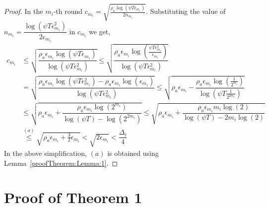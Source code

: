 \begin{proof}
In the $m_i$-th round $c_{m_i} =\sqrt{\frac{\rho_{a}\log (\psi T\epsilon_{m_{i}})}{2 n_{m_i}}}$. Substituting the value of $n_{m_i}=\dfrac{\log{(\psi T\epsilon_{m_{i}}^{2})}}{2\epsilon_{m_{i}}}$ in $c_{m_i}$ we get,
\begin{align*}
	c_{m_i} &\leq \sqrt{\dfrac{\rho_a \epsilon_{m_{i}}\log (\psi T\epsilon_{m_{i}})}{\log(\psi T\epsilon_{m_{i}}^{2})}} \leq \sqrt{\dfrac{\rho_a \epsilon_{m_{i}}\log (\frac{\psi T\epsilon_{m_{i}}^{2}}{\epsilon_{m_{i}}})}{\log(\psi T\epsilon_{m_{i}}^{2})}} \\
	& = \sqrt{\dfrac{\rho_a\epsilon_{m_{i}}\log (\psi T\epsilon_{m_{i}}^{2}) - \rho_a\epsilon_{m_{i}}\log (\epsilon_{m_{i}})}{\log(\psi T\epsilon_{m_{i}}^{2})}} 
	\leq  \sqrt{\rho_a\epsilon_{m_{i}} - \dfrac{\rho_a\epsilon_{m_i}\log(\frac{1}{2^{m_i}})}{\log(\psi T \frac{1}{2^{2m_i}})}} \\
	&\leq \sqrt{\rho_a\epsilon_{m_{i}} + \dfrac{\rho_a\epsilon_{m_i}\log(2^{m_i})}{\log(\psi T) - \log( 2^{2m_i})}}  \leq \sqrt{\rho_a\epsilon_{m_{i}} + \dfrac{\rho_a\epsilon_{m_i}m_i \log(2)}{\log(\psi T) - 2m_i\log( 2)}} \\ 
	 & \overset{(a)}{\leq} \sqrt{\rho_a\epsilon_{m_{i}} + \frac{3}{2}\epsilon_{m_i}} 
	  < \sqrt{2\epsilon_{m_i}} 
	  < \dfrac{\Delta_{i}}{4} 
	\end{align*}
In the above simplification, $(a)$ is obtained using Lemma~\ref{proofTheorem:Lemma:1}. 
\end{proof}



\section{Proof of Theorem 1}
\label{sec:proofTheorem}



